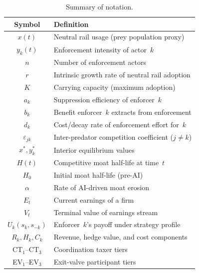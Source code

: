 \documentclass[12pt]{article}
\theoremstyle{definition}
\theoremstyle{remark}
\begin{document}
\begin{table}[h]
\centering
\begin{tabular}{@{}cl@{}}
\toprule
Symbol & Definition \\
\midrule
$x(t)$                 & Neutral rail usage (prey population proxy) \\
$y_k(t)$               & Enforcement intensity of actor~$k$ \\
$n$                    & Number of enforcement actors \\
$r$                    & Intrinsic growth rate of neutral rail adoption \\
$K$                    & Carrying capacity (maximum adoption) \\
$a_k$                  & Suppression efficiency of enforcer~$k$ \\
$b_k$                  & Benefit enforcer~$k$ extracts from enforcement \\
$d_k$                  & Cost/decay rate of enforcement effort for~$k$ \\
$\varepsilon_{jk}$     & Inter-predator competition coefficient ($j \neq k$) \\
$x^{*}, y_k^{*}$      & Interior equilibrium values \\
$H(t)$                 & Competitive moat half-life at time~$t$ \\
$H_0$                  & Initial moat half-life (pre-AI) \\
$\alpha$               & Rate of AI-driven moat erosion \\
$E_t$                  & Current earnings of a firm \\
$V_t$                  & Terminal value of earnings stream \\
$U_k(s_k, s_{-k})$    & Enforcer~$k$'s payoff under strategy profile \\
$R_k, H_k, C_k$       & Revenue, hedge value, and cost components \\
CT$_1$--CT$_3$         & Coordination taxer tiers \\
EV$_1$--EV$_3$         & Exit-valve participant tiers \\
\bottomrule
\end{tabular}
\caption{Summary of notation.}
\label{tab:notation}
\end{table}
\end{document}

